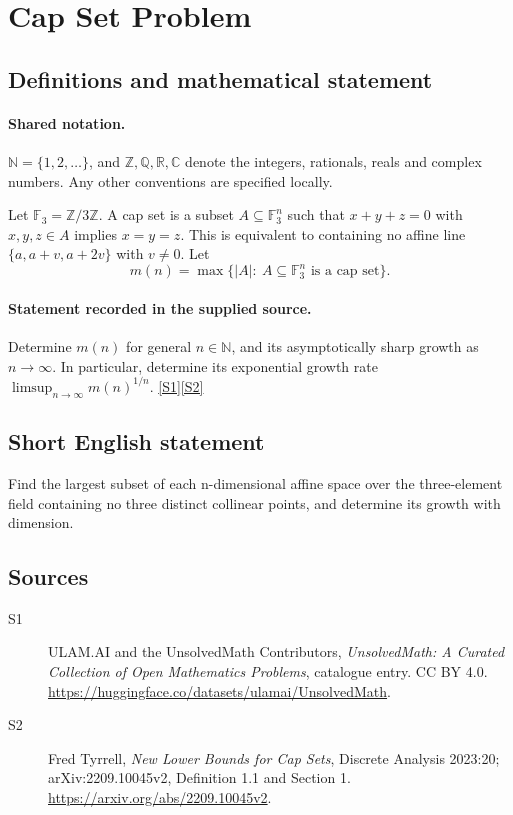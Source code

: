 \documentclass[11pt]{article}
\newcommand{\sref}[2]{\hyperlink{source:#1:#2}{[S#2]}}
\begin{document}
\section{Cap Set Problem}\label{statement}

\subsection{Definitions and mathematical statement}

\paragraph{Shared notation.}$\mathbb N=\{1,2,\ldots\}$, and $\mathbb Z,\mathbb Q,\mathbb R,\mathbb C$ denote the integers, rationals, reals and complex numbers. Any other conventions are specified locally.


Let $\mathbb F_3=\mathbb Z/3\mathbb Z$. A cap set is a subset $A\subseteq\mathbb F_3^n$ such that $x+y+z=0$ with $x,y,z\in A$ implies $x=y=z$. This is equivalent to containing no affine line $\{a,a+v,a+2v\}$ with $v\ne0$. Let
\[
 m(n)=\max\{|A|:\ A\subseteq\mathbb F_3^n\text{ is a cap set}\}.
\]
\paragraph{Statement recorded in the supplied source.}
Determine $m(n)$ for general $n\in\mathbb N$, and its asymptotically sharp growth as $n\to\infty$. In particular, determine its exponential growth rate $\limsup_{n\to\infty}m(n)^{1/n}$. \sref{statement}{1}\sref{statement}{2}
\subsection{Short English statement}
Find the largest subset of each n-dimensional affine space over the three-element field containing no three distinct collinear points, and determine its growth with dimension.
\subsection{Sources}
\begin{description}
\item[\hypertarget{source:statement:1}{S1}] ULAM.AI and the UnsolvedMath Contributors, \emph{UnsolvedMath: A Curated Collection of Open Mathematics Problems}, catalogue entry. CC BY 4.0. \url{https://huggingface.co/datasets/ulamai/UnsolvedMath}.
\item[\hypertarget{source:statement:2}{S2}] Fred Tyrrell, \emph{New Lower Bounds for Cap Sets}, Discrete Analysis 2023:20; arXiv:2209.10045v2, Definition 1.1 and Section 1. \url{https://arxiv.org/abs/2209.10045v2}.
\end{description}
\label{end:statement}
\end{document}
